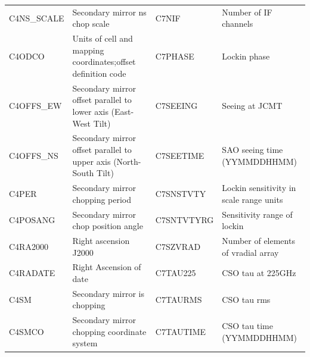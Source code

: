 \documentclass[final,authoryear,5p,times,twocolumn]{elsarticle}
\begin{document}
\begin{table}[t]
\begin{tabular}{|lp{2.0in}|lp{2.0in}|}
C4NS\_SCALE & Secondary mirror ns chop scale & C7NIF & Number of IF channels\\
C4ODCO & Units of cell and mapping coordinates;offset definition code & C7PHASE & Lockin phase\\
C4OFFS\_EW & Secondary mirror offset parallel to lower axis (East-West Tilt) & C7SEEING & Seeing at JCMT\\
C4OFFS\_NS & Secondary mirror offset parallel to upper axis (North-South Tilt) & C7SEETIME & SAO seeing time (YYMMDDHHMM)\\
C4PER & Secondary mirror chopping period & C7SNSTVTY & Lockin sensitivity in scale range units\\
C4POSANG & Secondary mirror chop position angle & C7SNTVTYRG & Sensitivity range of lockin\\
C4RA2000 & Right ascension J2000 & C7SZVRAD & Number of elements of vradial array\\
C4RADATE & Right Ascension of date & C7TAU225 & CSO tau at 225GHz\\
C4SM & Secondary mirror is chopping & C7TAURMS & CSO tau rms\\
C4SMCO & Secondary mirror chopping coordinate system & C7TAUTIME & CSO tau time (YYMMDDHHMM)\\
\hline
\end{tabular}
\end{table}
\end{document}
